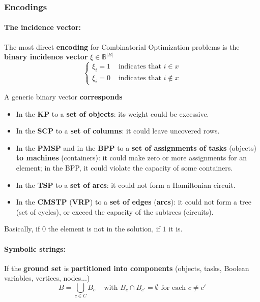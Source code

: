 \documentclass[11pt]{article}
\begin{document}
	\subsubsection{Encodings}
	
	\paragraph{The incidence vector:} The most direct \textbf{encoding} for Combinatorial Optimization problems is the \textbf{binary incidence vector} $\xi \in \mathbb{B}^{|B|}$
	$$ 
	\begin{cases}
		\xi_i = 1 & \text{ indicates that } i \in x \\
		\xi_i = 0 & \text{ indicates that } i \notin x
	\end{cases}
	$$
	
	A generic binary vector \textbf{corresponds}
	\begin{itemize}
		\item In the \textbf{KP} to a \textbf{set of objects}: its weight could be excessive.\\
		
		\item In the \textbf{SCP} to a \textbf{set of columns}: it could leave uncovered rows.\\
		
		\item In the \textbf{PMSP} and in the \textbf{BPP} to a \textbf{set of assignments of tasks} (objects) \textbf{to machines} (containers): it could make zero or more assignments for an element; in the BPP, it could violate the capacity of some containers.\\
		
		\item In the \textbf{TSP} to a \textbf{set of arcs}: it could not form a Hamiltonian circuit.\\
		
		\item In the \textbf{CMSTP} (\textbf{VRP}) to a \textbf{set of edges} (\textbf{arcs}): it could not form a tree (set of cycles), or exceed the capacity of the subtrees (circuits).\\
	\end{itemize}
	
	Basically, if $0$ the element is not in the solution, if $1$ it is.\\
	
	\newpage
	
	\paragraph{Symbolic strings:} If the \textbf{ground set} is \textbf{partitioned into components} (objects, tasks, Boolean variables, vertices, nodes...)
	$$ B = \bigcup_{c \in C} B_c \;\;\; \text{ with } B_c \cap B_{c'} = \emptyset \text{ for each } c \neq c' $$
	
\end{document}
